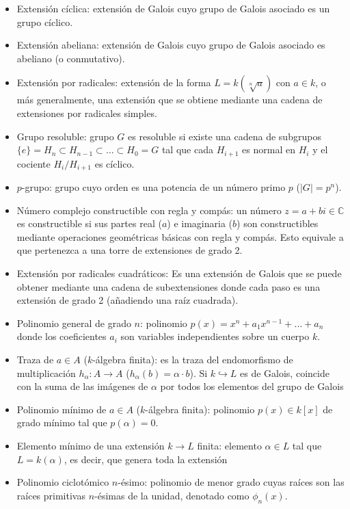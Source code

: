 \begin{itemize}
    \item Extensión cíclica: extensión de Galois cuyo grupo de Galois asociado es un grupo cíclico.
    \item Extensión abeliana: extensión de Galois cuyo grupo de Galois asociado es abeliano (o conmutativo).
    \item Extensión por radicales: extensión de la forma $L = k(\sqrt[n]{a})$ con $a \in k$, o más generalmente, una extensión que se obtiene mediante una cadena de extensiones por radicales simples.
    \item Grupo resoluble: grupo $G$ es resoluble si existe una cadena de subgrupos $\{e\} = H_n \subset H_{n-1} \subset \dots \subset H_0 = G$ tal que cada $H_{i+1}$ es normal en $H_i$ y el cociente $H_i/H_{i+1}$ es cíclico. 
    \item $p$-grupo: grupo cuyo orden es una potencia de un número primo $p$ ($|G| = p^n$). 
    \item Número complejo constructible con regla y compás: un número $z = a+bi \in \mathbb{C}$ es constructible si sus partes real ($a$) e imaginaria ($b$) son constructibles mediante operaciones geométricas básicas con regla y compás. Esto equivale a que pertenezca a una torre de extensiones de grado 2.
    \item  Extensión por radicales cuadráticos: Es una extensión de Galois que se puede obtener mediante una cadena de subextensiones donde cada paso es una extensión de grado 2 (añadiendo una raíz cuadrada).
    \item Polinomio general de grado $n$: polinomio $p(x) = x^n + a_1x^{n-1} + \dots + a_n$ donde los coeficientes $a_i$ son variables independientes sobre un cuerpo $k$.
    \item Traza de $a \in A$ ($k$-álgebra finita): es la traza del endomorfismo de multiplicación $h_\alpha: A \rightarrow A$ ($h_\alpha(b) = \alpha \cdot b$). Si $k \hookrightarrow L$ es de Galois, coincide con la suma de las imágenes de $\alpha$ por todos los elementos del grupo de Galois
    \item Polinomio mínimo de $a \in A$ ($k$-álgebra finita): polinomio $p(x) \in k[x]$ de grado mínimo tal que $p(\alpha) = 0$. 
    \item Elemento mínimo de una extensión $k \rightarrow L$ finita: elemento $\alpha \in L$ tal que $L = k(\alpha)$, es decir, que genera toda la extensión
    \item Polinomio ciclotómico $n$-ésimo: polinomio de menor grado cuyas raíces son las raíces primitivas $n$-ésimas de la unidad, denotado como $\phi_n(x)$. 
\end{itemize}

